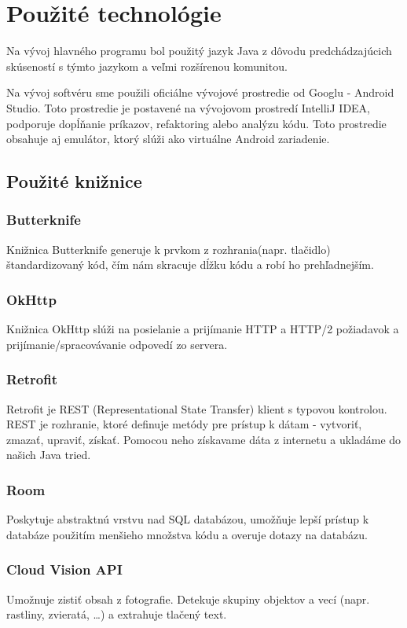 \documentclass{template/socthesis}
\begin{document}
\section{Použité technológie}
Na vývoj hlavného programu bol použitý jazyk Java z dôvodu predchádzajúcich skúseností s týmto jazykom a veľmi rozšírenou komunitou.

Na vývoj softvéru sme použili oficiálne vývojové prostredie od Googlu - Android Studio. Toto prostredie je postavené na vývojovom prostredí IntelliJ IDEA, podporuje dopĺňanie príkazov, refaktoring alebo analýzu kódu. Toto prostredie obsahuje aj emulátor, ktorý slúži ako virtuálne Android zariadenie.

\subsection{Použité knižnice}
\subsubsection{Butterknife}
Knižnica Butterknife generuje k prvkom z rozhrania(napr. tlačidlo) štandardizovaný kód, čím nám skracuje dĺžku kódu a robí ho prehľadnejším.
\subsubsection{OkHttp}
Knižnica OkHttp slúži na posielanie a prijímanie HTTP a HTTP/2 požiadavok a prijímanie/spracovávanie odpovedí zo servera.
\subsubsection{Retrofit}
Retrofit je REST (Representational State Transfer) klient s typovou kontrolou. REST je rozhranie, ktoré definuje metódy pre prístup k dátam - vytvoriť, zmazať, upraviť, získať. Pomocou neho získavame dáta z internetu a ukladáme do našich Java tried.
\subsubsection{Room}
Poskytuje abstraktnú vrstvu nad SQL databázou, umožňuje lepší prístup k databáze použitím menšieho množstva kódu a overuje dotazy na databázu.
\subsubsection{Cloud Vision API}
Umožnuje zistiť obsah z fotografie. Detekuje skupiny objektov a vecí (napr. rastliny, zvieratá, …) a extrahuje tlačený text.
\end{document}
